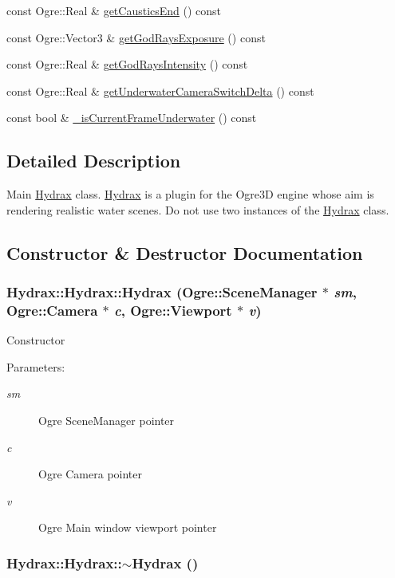 \begin{CompactItemize}
const Ogre::Real \& \hyperlink{class_hydrax_1_1_hydrax_608b120b0ee226cf85b1c5a1720f65a6}{getCausticsEnd} () const 
\item 
const Ogre::Vector3 \& \hyperlink{class_hydrax_1_1_hydrax_562ddb88c1218f3eecc5889efb2ff7f3}{getGodRaysExposure} () const 
\item 
const Ogre::Real \& \hyperlink{class_hydrax_1_1_hydrax_7e9e195b0df7b42440d6a93914527186}{getGodRaysIntensity} () const 
\item 
const Ogre::Real \& \hyperlink{class_hydrax_1_1_hydrax_1626067a6e76d34ec5733da9f19615e0}{getUnderwaterCameraSwitchDelta} () const 
\item 
const bool \& \hyperlink{class_hydrax_1_1_hydrax_1532419b2859aed22a63d913c527ce21}{\_\-isCurrentFrameUnderwater} () const 
\end{CompactItemize}


\subsection{Detailed Description}
Main \hyperlink{class_hydrax_1_1_hydrax}{Hydrax} class. \hyperlink{class_hydrax_1_1_hydrax}{Hydrax} is a plugin for the Ogre3D engine whose aim is rendering realistic water scenes. Do not use two instances of the \hyperlink{class_hydrax_1_1_hydrax}{Hydrax} class. 

\subsection{Constructor \& Destructor Documentation}
\hypertarget{class_hydrax_1_1_hydrax_58642a636963c02a5aa689a66827cae8}{
\subsubsection[{Hydrax}]{\setlength{\rightskip}{0pt plus 5cm}Hydrax::Hydrax::Hydrax (Ogre::SceneManager $\ast$ {\em sm}, \/  Ogre::Camera $\ast$ {\em c}, \/  Ogre::Viewport $\ast$ {\em v})}}
\label{class_hydrax_1_1_hydrax_58642a636963c02a5aa689a66827cae8}


Constructor \begin{Desc}
\item[Parameters:]
\begin{description}
\item[{\em sm}]Ogre SceneManager pointer \item[{\em c}]Ogre Camera pointer \item[{\em v}]Ogre Main window viewport pointer \end{description}
\end{Desc}
\hypertarget{class_hydrax_1_1_hydrax_b340dd13dc9dfc678ef703abf4d37949}{
\subsubsection[{$\sim$Hydrax}]{\setlength{\rightskip}{0pt plus 5cm}Hydrax::Hydrax::$\sim$Hydrax ()}}
\label{class_hydrax_1_1_hydrax_b340dd13dc9dfc678ef703abf4d37949}


